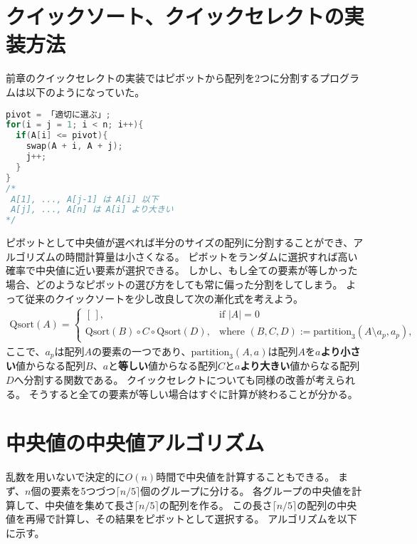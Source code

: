 \documentclass[a4paper,twoside,onecolumn,openany,article,10pt]{memoir}
\theoremstyle{remark}
\begin{document}
\section{クイックソート、クイックセレクトの実装方法}
前章のクイックセレクトの実装ではピボットから配列を2つに分割するプログラムは以下のようになっていた。
\begin{lstlisting}[basicstyle=\ttfamily\normalsize,showstringspaces=false,language=C,frame=single]
pivot = 「適切に選ぶ」;
for(i = j = 1; i < n; i++){
  if(A[i] <= pivot){
    swap(A + i, A + j);
    j++;
  }
}
/*
 A[1], ..., A[j-1] は A[i] 以下
 A[j], ..., A[n] は A[i] より大きい
*/
\end{lstlisting}
ピボットとして中央値が選べれば半分のサイズの配列に分割することができ、アルゴリズムの時間計算量は小さくなる。
ピボットをランダムに選択すれば高い確率で中央値に近い要素が選択できる。
しかし、もし全ての要素が等しかった場合、どのようなピボットの選び方をしても常に偏った分割をしてしまう。
よって従来のクイックソートを少し改良して次の漸化式を考えよう。
\begin{align*}
\mathrm{Qsort}(A) =
\begin{cases}
[\,],& \text{if } |A| = 0\\
\mathrm{Qsort}(B) \circ C \circ\mathrm{Qsort}(D),&\text{where }
(B, C, D) := \mathrm{partition}_3(A\setminus a_p, a_p),\, 
\end{cases}
\end{align*}
ここで、$a_p$は配列$A$の要素の一つであり、$\mathrm{partition}_3(A, a)$は配列$A$を$a$\textbf{より小さい}値からなる配列$B$、$a$と\textbf{等しい}値からなる配列$C$と$a$\textbf{より大きい}値からなる配列$D$へ分割する関数である。
クイックセレクトについても同様の改善が考えられる。
そうすると全ての要素が等しい場合はすぐに計算が終わることが分かる。


\section{中央値の中央値アルゴリズム}
乱数を用いないで決定的に$O(n)$時間で中央値を計算することもできる。
まず、$n$個の要素を5つづつ$\lceil n/5\rceil$個のグループに分ける。
各グループの中央値を計算して、中央値を集めて長さ$\lceil n/5\rceil$の配列を作る。
この長さ$\lceil n/5\rceil$の配列の中央値を再帰で計算し、その結果をピボットとして選択する。
アルゴリズムを以下に示す。
\end{document}
